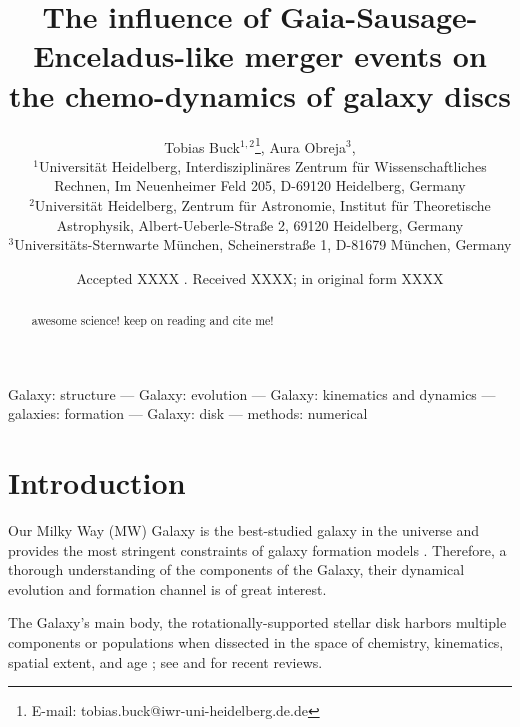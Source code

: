 \documentclass[useAMS,usenatbib]{mnras}
\title[Early massive accretion events in MW-mass galaxies]{The influence of Gaia-Sausage-Enceladus-like merger events on the chemo-dynamics of galaxy discs}
\author[T. Buck] {Tobias Buck$^{1,2}$\thanks{E-mail: tobias.buck@iwr-uni-heidelberg.de.de}, Aura Obreja$^{3}$, \etal \\  %
%
$^1$Universit\"at Heidelberg, Interdisziplin\"ares Zentrum f\"ur Wissenschaftliches Rechnen, Im Neuenheimer Feld 205, D-69120 Heidelberg, Germany\\
$^2$Universit\"at Heidelberg, Zentrum f\"ur Astronomie, Institut f\"ur Theoretische Astrophysik, Albert-Ueberle-Straße 2, 69120 Heidelberg, Germany\\
$^3$Universit\"ats-Sternwarte M\"unchen, Scheinerstraße 1, D-81679 M\"unchen, Germany%
}
\begin{document}
\date{Accepted XXXX . Received XXXX; in original form XXXX}

\pagerange{\pageref{firstpage}--\pageref{lastpage}} 

\maketitle

\label{firstpage}


\begin{abstract}
awesome science! keep on reading and cite me! 
\end{abstract}

\noindent
\begin{keywords}

Galaxy: structure --- Galaxy: evolution --- Galaxy: kinematics and dynamics --- galaxies:
  formation --- Galaxy: disk --- methods: numerical
 \end{keywords}



\section{Introduction} \label{sec:introduction}

Our Milky Way (MW) Galaxy is the best-studied galaxy in the
universe and provides the most stringent constraints of galaxy formation
models \citep[e.g.,][]{Guedes11, Wetzel16, Grand17, Buck21}. Therefore, a thorough understanding of the components of the Galaxy, their dynamical evolution and formation channel is of great interest.

The Galaxy's main body, the rotationally-supported stellar disk harbors multiple components or populations when dissected in the space of chemistry, kinematics, spatial extent, and age \citep[e.g.,][]{Gilmore83, Norris85, Chiba00, Nissen10, Bovy12, Haywood13}; see \citet{Rix13} and \citet{Bland-Hawthorn16} for recent reviews. %
\end{document}
